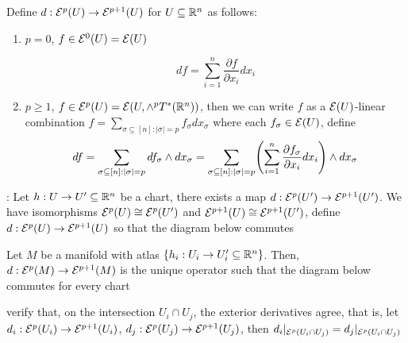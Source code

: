 \begin{definition}
	Define $d: \mathcal{E}^p(U) \to \mathcal{E}^{p+1}(U)$ for $U \subseteq \mathbb{R}^n$ as follows:
	
	\begin{enumerate}
		\item $p = 0$, $f \in \mathcal{E}^0(U) = \mathcal{E}(U)$
		
		$$
		df = \sum_{i=1}^n \frac{ \partial f}{ \partial x_i} dx_i
		$$
		
		\item $p \geq 1$, $f \in \E^p(U) = \E\tuple*{U, \wedge^p T^*(\R^n)}$, then we can write $f$ as a $\mathcal{E}(U)$-linear combination $f = \sum_{\sigma \subseteq [n]: |\sigma|=p} f_\sigma dx_\sigma$ where each $f_\sigma \in \mathcal{E}(U)$, define
		$$
			df = \sum_{\sigma \subseteq [n]: |\sigma|=p} df_\sigma \wedge dx_\sigma = \sum_{\sigma \subseteq [n]: |\sigma|=p} \tuple*{\sum_{i=1}^n \frac{\partial f_\sigma}{\partial x_i} dx_i} \wedge dx_\sigma
		$$
		
	\end{enumerate}
\end{definition}

\begin{definition}:
	Let $h: U \to U' \subseteq \mathbb{R}^n$ be a chart, there exists a map $d: \mathcal{E}^p(U') \to \mathcal{E}^{p+1}(U')$. 	We have isomorphisms $\mathcal{E}^p(U) \cong \mathcal{E}^p(U')$ and $\mathcal{E}^{p+1}(U) \cong \mathcal{E}^{p+1}(U')$, define $d: \mathcal{E}^p(U) \to \mathcal{E}^{p+1}(U)$ so that the diagram below commutes
	\begin{center}
	\end{center}
	
	Let $M$ be a manifold with atlas $\{h_i: U_i \to U_i' \subseteq \mathbb{R}^n\}$. Then, $d: \mathcal{E}^p(M) \to \mathcal{E}^{p+1}(M)$ is the unique operator such that the diagram below commutes for every chart
	
	\begin{center}
	\end{center}
	
	
	 verify that, on the intersection $U_i \cap U_j$, the exterior derivatives agree, that is, let $d_i: \mathcal{E}^p(U_i) \to \mathcal{E}^{p+1}(U_i)$, $d_j: \mathcal{E}^p(U_j) \to \mathcal{E}^{p+1}(U_j)$, then $d_i\vert_{\mathcal{E}^p(U_i \cap U_j)} = d_j\vert_{\mathcal{E}^p(U_i \cap U_j)}$
\end{definition}

